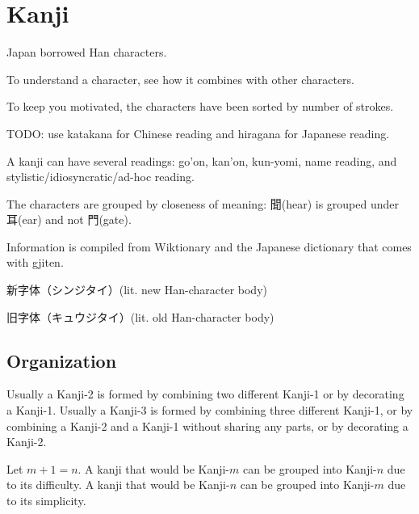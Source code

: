 \chapter{Kanji}

Japan borrowed Han characters.

To understand a character, see how it combines with other characters.

To keep you motivated, the characters have been sorted by number of strokes.

TODO: use katakana for Chinese reading and hiragana for Japanese reading.

A kanji can have several readings:
go'on, kan'on, kun-yomi, name reading, and stylistic/idiosyncratic/ad-hoc reading.

The characters are grouped by closeness of meaning:
聞(hear) is grouped under 耳(ear) and not 門(gate).

Information is compiled from Wiktionary
and the Japanese dictionary that comes with gjiten.

新字体（シンジタイ）(lit. new Han-character body)

旧字体（キュウジタイ）(lit. old Han-character body)

\section{Organization}

Usually a Kanji-2 is formed by combining two different Kanji-1
or by decorating a Kanji-1.
Usually a Kanji-3 is formed by combining three different Kanji-1,
or by combining a Kanji-2 and a Kanji-1 without sharing any parts,
or by decorating a Kanji-2.

Let \(m+1 = n\).
A kanji that would be Kanji-\(m\)
can be grouped into Kanji-\(n\) due to its difficulty.
A kanji that would be Kanji-\(n\)
can be grouped into Kanji-\(m\) due to its simplicity.

